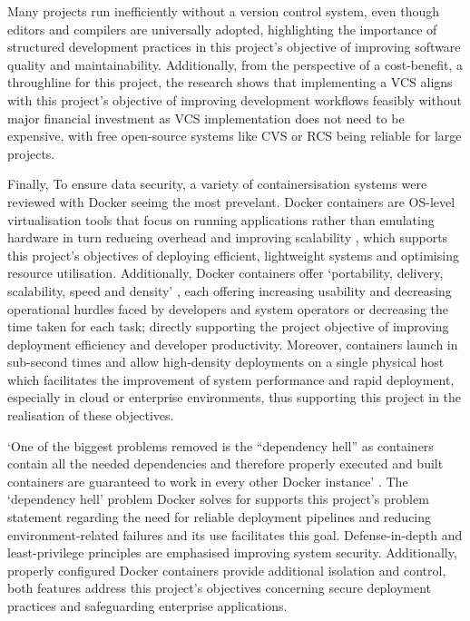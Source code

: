 \documentclass{report}
\begin{document}
Many projects run inefficiently without a version control system, even though editors and compilers are universally adopted, highlighting the importance of structured development practices in this project's objective of improving software quality and maintainability. 
Additionally, from the perspective of a cost-benefit, a throughline for this project, the research shows that implementing a VCS aligns with this project's objective of improving development workflows feasibly without major financial investment as VCS implementation does not need to be expensive, with free open-source systems like CVS or RCS being reliable for large projects.

Finally, To ensure data security, a variety of containersisation systems were reviewed with Docker seeimg the most prevelant. Docker containers are OS-level virtualisation tools that focus on running applications rather than emulating hardware in turn reducing overhead and improving scalability \parencite{vaseAdvantagesDocker2015}, which supports this project's objectives of deploying efficient, lightweight systems and optimising resource utilisation. 
Additionally, Docker containers offer `portability, delivery, scalability, speed and density' \parencite{vaseAdvantagesDocker2015}, each offering increasing usability and decreasing operational hurdles faced by developers and system operators or decreasing the time taken for each task; directly supporting the project objective of improving deployment efficiency and developer productivity. 
Moreover, containers launch in sub-second times and allow high-density deployments on a single physical host \parencite{vaseAdvantagesDocker2015} which facilitates the improvement of system performance and rapid deployment, especially in cloud or enterprise environments, thus supporting this project in the realisation of these objectives.

`One of the biggest problems removed is the “dependency hell” as containers contain all the needed dependencies and therefore properly executed and built containers are guaranteed to work in every other Docker instance' \parencite{vaseAdvantagesDocker2015}. 
The `dependency hell' problem Docker solves for supports this project's problem statement regarding the need for reliable deployment pipelines and reducing environment-related failures and its use facilitates this goal. 
Defense-in-depth and least-privilege principles are emphasised improving system security. 
Additionally, properly configured Docker containers provide additional isolation and control, both features address this project's objectives concerning secure deployment practices and safeguarding enterprise applications.
\end{document}
